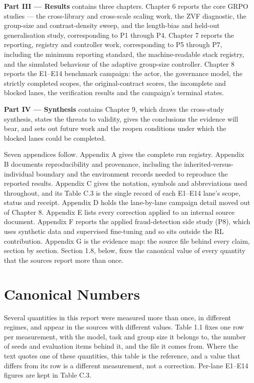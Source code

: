 \documentclass[12pt,a4paper]{report}
\begin{document}
\textbf{Part III --- Results} contains three chapters. Chapter 6 reports
the core GRPO studies --- the cross-library and cross-scale scaling
work, the ZVF diagnostic, the group-size and contrast-density sweep, and
the length-bias and held-out generalisation study, corresponding to P1
through P4. Chapter 7 reports the reporting, registry and controller
work, corresponding to P5 through P7, including the minimum reporting
standard, the machine-readable stack registry, and the simulated
behaviour of the adaptive group-size controller. Chapter 8 reports the
E1--E14 benchmark campaign: the actor, the governance model, the
strictly completed scopes, the original-contract scores, the incomplete
and blocked lanes, the verification results and the campaign's terminal
states.

\textbf{Part IV --- Synthesis} contains Chapter 9, which draws the
cross-study synthesis, states the threats to validity, gives the
conclusions the evidence will bear, and sets out future work and the
reopen conditions under which the blocked lanes could be completed.

Seven appendices follow. Appendix A gives the complete run registry.
Appendix B documents reproducibility and provenance, including the
inherited-versus-individual boundary and the environment records needed
to reproduce the reported results. Appendix C gives the notation,
symbols and abbreviations used throughout, and its Table C.3 is the
single record of each E1--E14 lane's scope, status and receipt. Appendix
D holds the lane-by-lane campaign detail moved out of Chapter 8.
Appendix E lists every correction applied to an internal source
document. Appendix F reports the applied fraud-detection side study
(P8), which uses synthetic data and supervised fine-tuning and so sits
outside the RL contribution. Appendix G is the evidence map: the source
file behind every claim, section by section. Section 1.8, below, fixes
the canonical value of every quantity that the sources report more than
once.

\section{Canonical Numbers}\label{canonical-numbers}

Several quantities in this report were measured more than once, in
different regimes, and appear in the sources with different values.
Table 1.1 fixes one row per measurement, with the model, task and group
size it belongs to, the number of seeds and evaluation items behind it,
and the file it comes from. Where the text quotes one of these
quantities, this table is the reference, and a value that differs from
its row is a different measurement, not a correction. Per-lane E1--E14
figures are kept in Table C.3.
\end{document}
